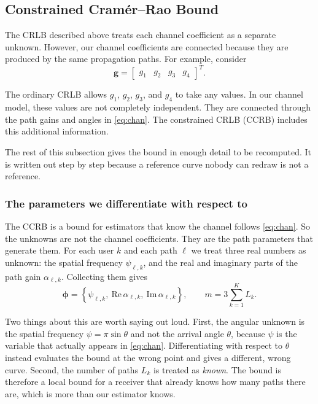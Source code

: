 \documentclass[journal]{IEEEtran}
\newcommand{\bg}{\mathbf{g}}
\begin{document}
\subsection{Constrained Cram\'er--Rao Bound}

The CRLB described above treats each channel coefficient as a separate unknown.
However, our channel coefficients are connected because they are produced by
the same propagation paths. For example, consider
\begin{equation}
\bg=\begin{bmatrix}g_1&g_2&g_3&g_4\end{bmatrix}^T.
\end{equation}

The ordinary CRLB allows $g_1$, $g_2$, $g_3$, and $g_4$ to take any values. In
our channel model, these values are not completely independent. They are
connected through the path gains and angles in \eqref{eq:chan}. The constrained
CRLB (CCRB) includes this additional information.

The rest of this subsection gives the bound in enough detail to be recomputed.
It is written out step by step because a reference curve nobody can redraw is
not a reference.

\subsubsection{The parameters we differentiate with respect to}

The CCRB is a bound for estimators that know the channel follows
\eqref{eq:chan}. So the unknowns are not the channel coefficients. They are the
path parameters that generate them. For each user $k$ and each path $\ell$ we
treat three real numbers as unknown: the spatial frequency $\psi_{\ell,k}$, and
the real and imaginary parts of the path gain $\alpha_{\ell,k}$. Collecting
them gives
\begin{equation}
\boldsymbol\phi=\left\{\psi_{\ell,k},\ \mathrm{Re}\,\alpha_{\ell,k},\
\mathrm{Im}\,\alpha_{\ell,k}\right\},
\qquad
m=3\sum_{k=1}^{K}L_k .
\label{eq:params}
\end{equation}

Two things about this are worth saying out loud. First, the angular unknown is
the spatial frequency $\psi=\pi\sin\theta$ and not the arrival angle $\theta$,
because $\psi$ is the variable that actually appears in \eqref{eq:chan}.
Differentiating with respect to $\theta$ instead evaluates the bound at the
wrong point and gives a different, wrong curve. Second, the number of paths
$L_k$ is treated as \emph{known}. The bound is therefore a local bound for a
receiver that already knows how many paths there are, which is more than our
estimator knows.
\end{document}
